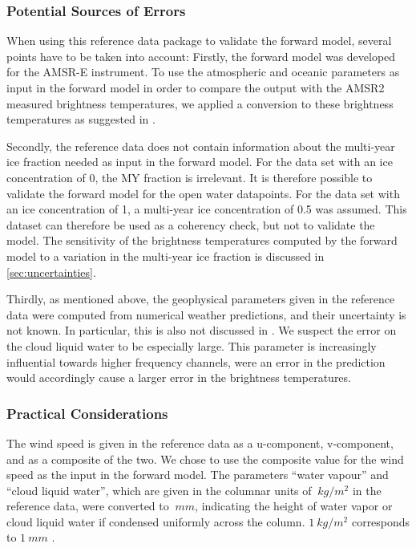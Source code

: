 \documentclass[11pt, a4paper]{article}
\begin{document}
\subsubsection{Potential Sources of Errors}
\label{sec:RefDat}
When using this reference data package to validate the forward model, several points have to be taken into account: Firstly, the forward model was developed for the AMSR-E instrument. To use the atmospheric and oceanic parameters as input in the forward model in order to compare the output with the AMSR2 measured brightness temperatures, we applied a conversion to these brightness temperatures as suggested in \cite{secret}.
\newline

Secondly, the reference data does not contain information about the multi-year ice fraction needed as input in the forward model. For the data set with an ice concentration of 0, the MY fraction is irrelevant. It is therefore possible to validate the forward model for the open water datapoints. For the data set with an ice concentration of 1, a multi-year ice concentration of 0.5 was assumed. This dataset can therefore be used as a coherency check, but not to validate the model. The sensitivity of the brightness temperatures computed by the forward model to a variation in the multi-year ice fraction is discussed in \ref{sec:uncertainties}.
\newline

Thirdly, as mentioned above, the geophysical parameters given in the reference data were computed from numerical weather predictions, and their uncertainty is not known. In particular, this is also not discussed in \cite{Wink2}. We suspect the error on the cloud liquid water to be especially large. This parameter is increasingly influential towards higher frequency channels, were an error in the prediction would accordingly cause a larger error in the brightness temperatures.

\subsubsection{Practical Considerations}
The wind speed is given in the reference data as a u-component, v-component, and as a composite of the two. %
We chose to use the composite value for the wind speed as the input in the forward model. %
The parameters ``water vapour'' and ``cloud liquid water'', which are given in the columnar units of $\SI{}{kg/m^2}$ in the reference data, were converted to $\SI{}{mm}$, indicating the height of water vapor or cloud liquid water if condensed uniformly across the column. $\SI{1}{kg/m^2}$ corresponds to $\SI{1}{mm}$ \cite{remss}.
\end{document}
